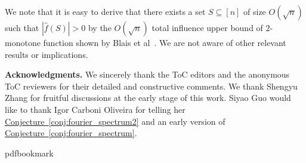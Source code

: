 \documentclass[11pt]{article}
\numberwithin{equation}{section}
\theoremstyle{definition}
\theoremstyle{plain}
\newcommand{\expref}[2]{\hyperref[#2]{#1~\ref{#2}}}
\begin{document}
We note that it is easy to derive that there exists a set $S\subseteq[n]$ of size $O(\sqrt{n})$ such that $|\hat{f}(S)|>0$ by the $O(\sqrt{n})$ total influence upper bound of $2$-monotone function shown by Blais et al~\cite{BCOST15}.  We are not aware of other relevant results or implications.  %


\vspace{4ex}
\noindent\textbf{Acknowledgments.} We sincerely thank the
ToC editors and the   %
anonymous ToC reviewers 
%
for their detailed and constructive comments. We thank Shengyu Zhang for fruitful discussions at the early stage of this work. Siyao Guo would like to thank Igor Carboni Oliveira for telling her \expref{Conjecture}{conj:fourier_spectrum2} and an early version of \expref{Conjecture}{conj:fourier_spectrum}. 


%
%


\newcommand{\prelim}{Preliminary version in\ }\newcommand{\prelims}{Preliminary
  versions in\ }
\providecommand{\bibhead}[1]{}
\expandafter\ifx\csname pdfbookmark\endcsname\relax%
  \providecommand{\tocrefpdfbookmark}{}
\else\providecommand{\tocrefpdfbookmark}{%
   \hypertarget{tocreferences}{}%
   \pdfbookmark[1]{References}{tocreferences}}%
\fi
\end{document}
